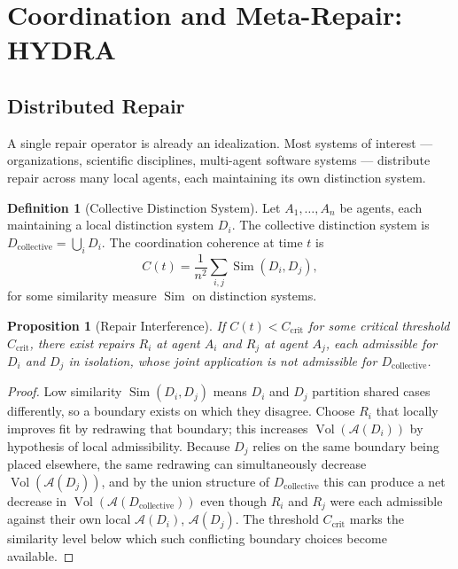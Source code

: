 \documentclass[11pt]{article}
\theoremstyle{plain}
\newtheorem{proposition}[theorem]{Proposition}
\theoremstyle{definition}
\newtheorem{definition}[theorem]{Definition}
\theoremstyle{remark}
\begin{document}
\section{Coordination and Meta-Repair: HYDRA}
\label{sec:hydra}

\subsection{Distributed Repair}

A single repair operator is already an idealization. Most systems of interest --- organizations, scientific disciplines, multi-agent software systems --- distribute repair across many local agents, each maintaining its own distinction system.

\begin{definition}[Collective Distinction System]
Let $A_1,\dots,A_n$ be agents, each maintaining a local distinction system $D_i$. The collective distinction system is $D_{\mathrm{collective}} = \bigcup_i D_i$. The coordination coherence at time $t$ is
\[
C(t) = \frac{1}{n^2}\sum_{i,j}\operatorname{Sim}(D_i, D_j),
\]
for some similarity measure $\operatorname{Sim}$ on distinction systems.
\end{definition}

\begin{proposition}[Repair Interference]
\label{prop:interference}
If $C(t) < C_{\mathrm{crit}}$ for some critical threshold $C_{\mathrm{crit}}$, there exist repairs $R_i$ at agent $A_i$ and $R_j$ at agent $A_j$, each admissible for $D_i$ and $D_j$ in isolation, whose joint application is not admissible for $D_{\mathrm{collective}}$.
\end{proposition}
\begin{proof}
Low similarity $\operatorname{Sim}(D_i,D_j)$ means $D_i$ and $D_j$ partition shared cases differently, so a boundary exists on which they disagree. Choose $R_i$ that locally improves fit by redrawing that boundary; this increases $\operatorname{Vol}(\mathcal{A}(D_i))$ by hypothesis of local admissibility. Because $D_j$ relies on the same boundary being placed elsewhere, the same redrawing can simultaneously decrease $\operatorname{Vol}(\mathcal{A}(D_j))$, and by the union structure of $D_{\mathrm{collective}}$ this can produce a net decrease in $\operatorname{Vol}(\mathcal{A}(D_{\mathrm{collective}}))$ even though $R_i$ and $R_j$ were each admissible against their own local $\mathcal{A}(D_i)$, $\mathcal{A}(D_j)$. The threshold $C_{\mathrm{crit}}$ marks the similarity level below which such conflicting boundary choices become available.
\end{proof}
\end{document}
